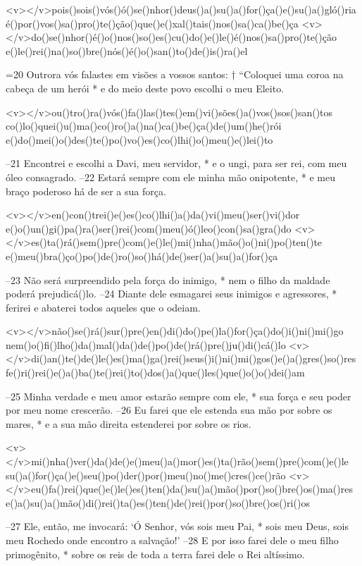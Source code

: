 <v></v>pois()sois()vós()ó()se()nhor()deus()a()su()a()for()ça()e()su()a()gló()ria
é()por()vos()sa()pro()te()ção()que()e()xal()tais()nos()sa()ca()be()ça
<v></v>do()se()nhor()é()o()nos()so()es()cu()do()e()le()é()nos()sa()pro()te()ção
e()le()rei()na()so()bre()nós()é()o()san()to()de()is()ra()el

=20 Outrora vós falastes em visões a vossos santos: †
“Coloquei uma coroa na cabeça de um herói *
e do meio deste povo escolhi o meu Eleito.

<v></v>ou()tro()ra()vós()fa()las()tes()em()vi()sões()a()vos()sos()san()tos
co()lo()quei()u()ma()co()ro()a()na()ca()be()ça()de()um()he()rói
e()do()mei()o()des()te()po()vo()es()co()lhi()o()meu()e()lei()to

–21 Encontrei e escolhi a Davi, meu servidor, *
e o ungi, para ser rei, com meu óleo consagrado. 
–22 Estará sempre com ele minha mão onipotente, *
e meu braço poderoso há de ser a sua força.

<v></v>en()con()trei()e()es()co()lhi()a()da()vi()meu()ser()vi()dor
e()o()un()gi()pa()ra()ser()rei()com()meu()ó()leo()con()sa()gra()do
<v></v>es()ta()rá()sem()pre()com()e()le()mi()nha()mão()o()ni()po()ten()te
e()meu()bra()ço()po()de()ro()so()há()de()ser()a()su()a()for()ça

–23 Não será surpreendido pela força do inimigo, *
nem o filho da maldade poderá prejudicá()lo. 
–24 Diante dele esmagarei seus inimigos e agressores, *
ferirei e abaterei todos aqueles que o odeiam.

<v></v>não()se()rá()sur()pre()en()di()do()pe()la()for()ça()do()i()ni()mi()go
nem()o()fi()lho()da()mal()da()de()po()de()rá()pre()ju()di()cá()lo
<v></v>di()an()te()de()le()es()ma()ga()rei()seus()i()ni()mi()gos()e()a()gres()so()res
fe()ri()rei()e()a()ba()te()rei()to()dos()a()que()les()que()o()o()dei()am

–25 Minha verdade e meu amor estarão sempre com ele, *
sua força e seu poder por meu nome crescerão. 
–26 Eu farei que ele estenda sua mão por sobre os mares, *
e a sua mão direita estenderei por sobre os rios.

<v></v>mi()nha()ver()da()de()e()meu()a()mor()es()ta()rão()sem()pre()com()e()le
su()a()for()ça()e()seu()po()der()por()meu()no()me()cres()ce()rão
<v></v>eu()fa()rei()que()e()le()es()ten()da()su()a()mão()por()so()bre()os()ma()res
e()a()su()a()mão()di()rei()ta()es()ten()de()rei()por()so()bre()os()ri()os

–27 Ele, então, me invocará: ‘Ó Senhor, vós sois meu Pai, *
sois meu Deus, sois meu Rochedo onde encontro a salvação!’ 
–28 E por isso farei dele o meu filho primogênito, *
sobre os reis de toda a terra farei dele o Rei altíssimo.


